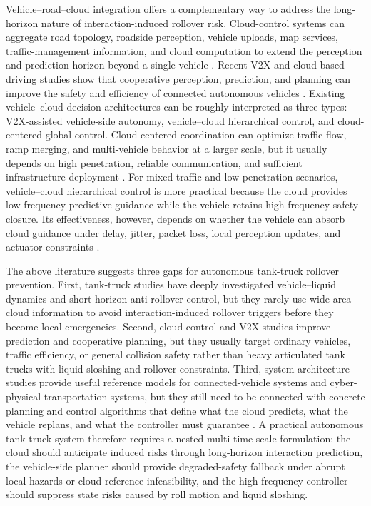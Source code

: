 Vehicle--road--cloud integration offers a complementary way to address the long-horizon nature of interaction-induced rollover risk. Cloud-control systems can aggregate road topology, roadside perception, vehicle uploads, map services, traffic-management information, and cloud computation to extend the perception and prediction horizon beyond a single vehicle \cite{likeqiang2020cloudcontrol,icv2023whiteroadcloud}. Recent V2X and cloud-based driving studies show that cooperative perception, prediction, and planning can improve the safety and efficiency of connected autonomous vehicles \cite{Huang2025V2X,Gao2025V2X}. Existing vehicle--cloud decision architectures can be roughly interpreted as three types: V2X-assisted vehicle-side autonomy, vehicle--cloud hierarchical control, and cloud-centered global control. Cloud-centered coordination can optimize traffic flow, ramp merging, and multi-vehicle behavior at a larger scale, but it usually depends on high penetration, reliable communication, and sufficient infrastructure deployment \cite{Yang2025CloudBased,Wang2025Cooperative}. For mixed traffic and low-penetration scenarios, vehicle--cloud hierarchical control is more practical because the cloud provides low-frequency predictive guidance while the vehicle retains high-frequency safety closure. Its effectiveness, however, depends on whether the vehicle can absorb cloud guidance under delay, jitter, packet loss, local perception updates, and actuator constraints \cite{xionglu2024_CVIS_survay,xuqing2021unreliable,wang2021platoonmpc}.

The above literature suggests three gaps for autonomous tank-truck rollover prevention. First, tank-truck studies have deeply investigated vehicle--liquid dynamics and short-horizon anti-rollover control, but they rarely use wide-area cloud information to avoid interaction-induced rollover triggers before they become local emergencies. Second, cloud-control and V2X studies improve prediction and cooperative planning, but they usually target ordinary vehicles, traffic efficiency, or general collision safety rather than heavy articulated tank trucks with liquid sloshing and rollover constraints. Third, system-architecture studies provide useful reference models for connected-vehicle systems and cyber-physical transportation systems, but they still need to be connected with concrete planning and control algorithms that define what the cloud predicts, what the vehicle replans, and what the controller must guarantee \cite{qixiaojing2026mbsose}. A practical autonomous tank-truck system therefore requires a nested multi-time-scale formulation: the cloud should anticipate induced risks through long-horizon interaction prediction, the vehicle-side planner should provide degraded-safety fallback under abrupt local hazards or cloud-reference infeasibility, and the high-frequency controller should suppress state risks caused by roll motion and liquid sloshing.

